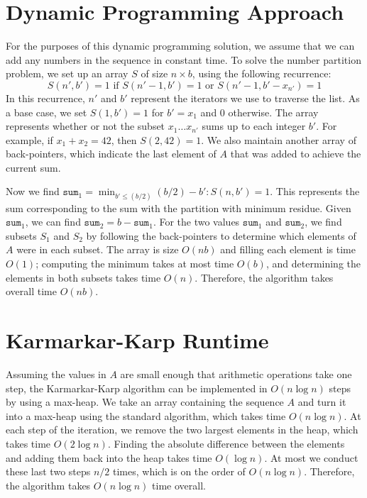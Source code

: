 \documentclass[solution, letterpaper]{cs121}
\begin{document}

\section*{Dynamic Programming Approach}
For the purposes of this dynamic programming solution, we assume that we can add any numbers in the sequence in constant time. To solve the number partition problem, we set up an array $S$ of size $n \times b$, using the following recurrence:
$$S(n',b') = 1 \text{ if } S(n'-1,b')=1 \text{ or } S(n'-1,b'-x_{n'})=1$$
In this recurrence, $n'$ and $b'$ represent the iterators we use to traverse the list. As a base case, we set $S(1,b') = 1$ for $b' = x_1$ and $0$ otherwise. The array represents whether or not the subset $x_1 \ldots x_{n'}$ sums up to each integer $b'$. For example, if $x_1 + x_2 = 42$, then $S(2,42) = 1$. We also maintain another array of back-pointers, which indicate the last element of $A$ that was added to achieve the current sum.

Now we find $\texttt{sum}_1 = \min_{b' \leq (b/2)}{(b/2) - b' : S(n,b') = 1}$. This represents the sum corresponding to the sum with the partition with minimum residue. Given $\texttt{sum}_1$, we can find $\texttt{sum}_2 = b - \texttt{sum}_1$. For the two values $\texttt{sum}_1$ and $\texttt{sum}_2$, we find subsets $S_1$ and $S_2$ by following the back-pointers to determine which elements of $A$ were in each subset. The array is size $O(nb)$ and filling each element is time $O(1)$; computing the minimum takes at most time $O(b)$, and determining the elements in both subsets takes time $O(n)$. Therefore, the algorithm takes overall time $O(nb)$.

\section*{Karmarkar-Karp Runtime}
\hspace{4mm} Assuming the values in $A$ are small enough that arithmetic operations take one step, the Karmarkar-Karp algorithm can be implemented in $O(n \log{n})$ steps by using a max-heap. We take an array containing the sequence $A$ and turn it into a max-heap using the standard algorithm, which takes time $O(n \log{n})$. At each step of the iteration, we remove the two largest elements in the heap, which takes time $O(2 \log{n})$. Finding the absolute difference between the elements and adding them back into the heap takes time $O(\log{n})$. At most we conduct these last two steps $n/2$ times, which is on the order of $O(n \log{n})$. Therefore, the algorithm takes $O(n \log{n})$ time overall.
\end{document}
